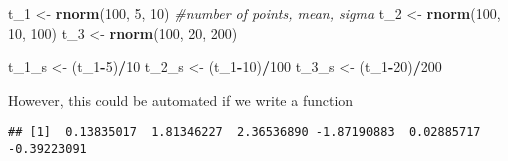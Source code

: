 \documentclass[]{article}
\newenvironment{Shaded}{\begin{snugshade}}{\end{snugshade}}
\newcommand{\KeywordTok}[1]{\textcolor[rgb]{0.13,0.29,0.53}{\textbf{#1}}}
\newcommand{\DecValTok}[1]{\textcolor[rgb]{0.00,0.00,0.81}{#1}}
\newcommand{\StringTok}[1]{\textcolor[rgb]{0.31,0.60,0.02}{#1}}
\newcommand{\CommentTok}[1]{\textcolor[rgb]{0.56,0.35,0.01}{\textit{#1}}}
\newcommand{\ControlFlowTok}[1]{\textcolor[rgb]{0.13,0.29,0.53}{\textbf{#1}}}
\newcommand{\OperatorTok}[1]{\textcolor[rgb]{0.81,0.36,0.00}{\textbf{#1}}}
\newcommand{\NormalTok}[1]{#1}
\begin{document}
\begin{Shaded}
\begin{Highlighting}[]
\NormalTok{t_}\DecValTok{1}\NormalTok{ <-}\StringTok{ }\KeywordTok{rnorm}\NormalTok{(}\DecValTok{100}\NormalTok{, }\DecValTok{5}\NormalTok{, }\DecValTok{10}\NormalTok{) }\CommentTok{#number of points, mean, sigma}
\NormalTok{t_}\DecValTok{2}\NormalTok{ <-}\StringTok{ }\KeywordTok{rnorm}\NormalTok{(}\DecValTok{100}\NormalTok{, }\DecValTok{10}\NormalTok{, }\DecValTok{100}\NormalTok{)}
\NormalTok{t_}\DecValTok{3}\NormalTok{ <-}\StringTok{ }\KeywordTok{rnorm}\NormalTok{(}\DecValTok{100}\NormalTok{, }\DecValTok{20}\NormalTok{, }\DecValTok{200}\NormalTok{)}

\NormalTok{t_1_s <-}\StringTok{ }\NormalTok{(t_}\DecValTok{1}\OperatorTok{-}\DecValTok{5}\NormalTok{)}\OperatorTok{/}\DecValTok{10} 
\NormalTok{t_2_s <-}\StringTok{ }\NormalTok{(t_}\DecValTok{1}\OperatorTok{-}\DecValTok{10}\NormalTok{)}\OperatorTok{/}\DecValTok{100}
\NormalTok{t_3_s <-}\StringTok{ }\NormalTok{(t_}\DecValTok{1}\OperatorTok{-}\DecValTok{20}\NormalTok{)}\OperatorTok{/}\DecValTok{200}
\end{Highlighting}
\end{Shaded}

However, this could be automated if we write a function

\begin{Shaded}
\end{Shaded}

\begin{verbatim}
## [1]  0.13835017  1.81346227  2.36536890 -1.87190883  0.02885717 -0.39223091
\end{verbatim}

\begin{Shaded}
\end{Shaded}
\end{document}
